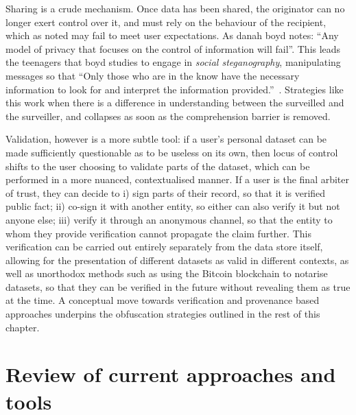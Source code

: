 \documentclass{IOS-Book-Article}     %
\begin{document}
Sharing is a crude mechanism. Once data has been shared, the originator can no
longer exert control over it, and must rely on the behaviour of the recipient,
which as noted may fail to meet user expectations. As danah boyd
notes: ``Any model of privacy that focuses on the control of information will
fail''. This leads the teenagers that boyd studies to
engage in \emph{social steganography}, manipulating messages so that ``Only 
those who are in the know have the necessary information to look for and interpret the information 
provided.''~\cite{boyd2012Networked}. Strategies like this work when there is a
difference in understanding between the surveilled and the surveiller, and
collapses as soon as the comprehension barrier is removed.

Validation, however is a more subtle tool:
if a user's personal dataset can be made sufficiently questionable as to be useless on its own,
then locus of control shifts to the user choosing to validate parts of the dataset,
which can be performed in a more nuanced,
contextualised manner. If a user is the final arbiter of trust, they can decide
to i) sign parts of their record, so that it is verified public fact; ii)
co-sign it with another entity, so either can  also verify it but not anyone 
else;
iii) verify it through an anonymous channel, so that the entity to whom they
provide verification cannot propagate the claim further. This verification can
be carried out entirely separately from the data store itself, allowing for the
presentation of different datasets as valid  in different contexts, as well as
unorthodox methods such as using the Bitcoin blockchain to notarise datasets, so
that they can be verified in the future without revealing them as true at the
time. A conceptual move towards verification and provenance based
approaches underpins the obfuscation strategies outlined in the rest of this
chapter.

\section{Review of current approaches and tools} 
\end{document}
